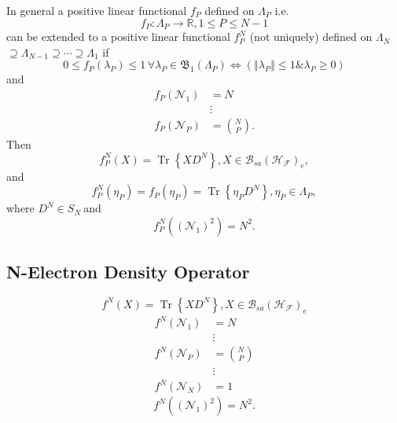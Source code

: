 \documentclass[aps,preprint]{revtex4}%
\begin{document}
In general a positive linear functional $f_{P}$ defined on $\Lambda_{P}$ i.e.
\begin{equation}
f_{P}:\Lambda_{P}\rightarrow\mathbb{R},1\leq P\leq N-1
\end{equation}
can be extended to a positive linear functional $f_{P}^{N}$ (not uniquely)
defined on $\Lambda_{N}$ $\supseteq\Lambda_{N-1}\supseteq\cdots\supseteq
\Lambda_{1}$ if
\begin{equation}
0\leq f_{P}\left(  \lambda_{P}\right)  \leq1\,\forall\lambda_{P}%
\in\mathfrak{B}_{1}\left(  \Lambda_{P}\right)  \Leftrightarrow\left(
\left\Vert \lambda_{P}\right\Vert \leq1\&\lambda_{P}\geq0\right)
\end{equation}
and
\begin{align}
f_{P}\left(  \mathcal{N}_{1}\right)   &  =N\nonumber\\
&  \vdots\nonumber\\
f_{P}\left(  \mathcal{N}_{P}\right)   &  =\binom{N}{P}.
\end{align}
Then
\begin{equation}
f_{P}^{N}\left(  X\right)  =\operatorname*{Tr}\left\{  XD^{N}\right\}
,X\in\mathcal{B}_{sa}\left(  \mathcal{H}_{\mathcal{F}}\right)  _{e},
\end{equation}
and
\begin{equation}
f_{P}^{N}\left(  \eta_{P}\right)  =f_{P}\left(  \eta_{P}\right)
=\operatorname*{Tr}\left\{  \eta_{P}D^{N}\right\}  ,\eta_{P}\in\Lambda_{P},
\end{equation}
where $D^{N}\in S_{N}\ $and
\begin{equation}
f_{P}^{N}\left(  \left(  \mathcal{N}_{1}\right)  ^{2}\right)  =N^{2}.
\end{equation}


\subsection{N-Electron Density Operator}%

\begin{equation}
f^{N}\left(  X\right)  =\operatorname*{Tr}\left\{  XD^{N}\right\}
,X\in\mathcal{B}_{sa}\left(  \mathcal{H}_{\mathcal{F}}\right)  _{e}%
\end{equation}%
\begin{align}
f^{N}\left(  \mathcal{N}_{1}\right)   &  =N\nonumber\\
&  \vdots\nonumber\\
f^{N}\left(  \mathcal{N}_{P}\right)   &  =\binom{N}{P}\nonumber\\
&  \vdots\nonumber\\
f^{N}\left(  \mathcal{N}_{N}\right)   &  =1
\end{align}%
\begin{equation}
f^{N}\left(  \left(  \mathcal{N}_{1}\right)  ^{2}\right)  =N^{2}.
\end{equation}
\end{document}
